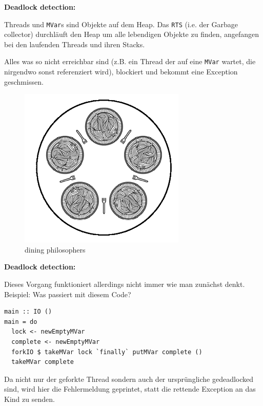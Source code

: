 \documentclass{beamer}
\begin{document}
\begin{frame}
\textbf{Deadlock detection:}

\begin{multicols}{2}
Threads und \texttt{MVar}s sind Objekte auf dem Heap. Das \texttt{RTS} (i.e. der Garbage collector) durchläuft den Heap um alle lebendigen Objekte zu finden, angefangen bei den laufenden Threads und ihren Stacks.\smallskip

Alles was so nicht erreichbar sind (z.B. ein Thread der auf eine \texttt{MVar} wartet, die nirgendwo sonst referenziert wird), blockiert und bekommt eine Exception geschmissen.

\columnbreak

\begin{figure}
\includegraphics[scale=0.52]{dining_philosophers.png} 
\caption{dining philosophers}
\end{figure}

\end{multicols}
\end{frame}


\begin{frame}[fragile]

\textbf{Deadlock detection:}\smallskip\smallskip

Dieses Vorgang funktioniert allerdings nicht immer wie man zunächst denkt.
Beispiel: Was passiert mit diesem Code?

\begin{verbatim}
main :: IO ()
main = do 
  lock <- newEmptyMVar
  complete <- newEmptyMVar
  forkIO $ takeMVar lock `finally` putMVar complete ()
  takeMVar complete
\end{verbatim}
\pause
\bigskip

Da nicht nur der geforkte Thread sondern auch der ursprüngliche gedeadlocked sind, wird hier die Fehlermeldung geprintet, statt die rettende Exception an das Kind zu senden.

\end{frame}
\end{document}
